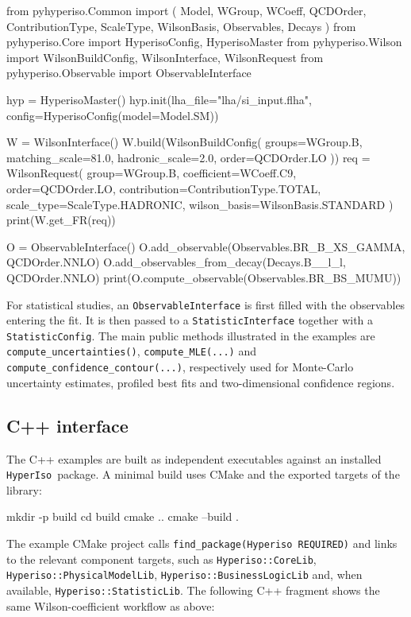 \documentclass[preprint,11pt]{elsarticle}
\newcommand{\hi}{\texttt{HyperIso}}
\begin{document}
\begin{pycode}
from pyhyperiso.Common import (
    Model, WGroup, WCoeff, QCDOrder,
    ContributionType, ScaleType, WilsonBasis,
    Observables, Decays
)
from pyhyperiso.Core import HyperisoConfig, HyperisoMaster
from pyhyperiso.Wilson import WilsonBuildConfig, WilsonInterface, WilsonRequest
from pyhyperiso.Observable import ObservableInterface

hyp = HyperisoMaster()
hyp.init(lha_file="lha/si_input.flha", config=HyperisoConfig(model=Model.SM))

W = WilsonInterface()
W.build(WilsonBuildConfig(
    groups={WGroup.B}, matching_scale=81.0,
    hadronic_scale=2.0, order=QCDOrder.LO
))
req = WilsonRequest(
    group=WGroup.B, coefficient=WCoeff.C9, order=QCDOrder.LO,
    contribution=ContributionType.TOTAL, scale_type=ScaleType.HADRONIC,
    wilson_basis=WilsonBasis.STANDARD
)
print(W.get_FR(req))

O = ObservableInterface()
O.add_observable(Observables.BR_B_XS_GAMMA, QCDOrder.NNLO)
O.add_observables_from_decay(Decays.B__l_l, QCDOrder.NNLO)
print(O.compute_observable(Observables.BR_BS_MUMU))
\end{pycode}

For statistical studies, an \texttt{ObservableInterface} is first filled with the observables entering the fit. It is then passed to a \texttt{StatisticInterface} together with a \texttt{StatisticConfig}. The main public methods illustrated in the examples are \texttt{compute\_uncertainties()}, \texttt{compute\_MLE(...)} and \texttt{compute\_confidence\_contour(...)}, respectively used for Monte-Carlo uncertainty estimates, profiled best fits and two-dimensional confidence regions.

\subsection{C++ interface}

The C++ examples are built as independent executables against an installed \hi~package. A minimal build uses CMake and the exported targets of the library:

\begin{terminal}
mkdir -p build
cd build
cmake ..
cmake --build .
\end{terminal}

The example CMake project calls \texttt{find\_package(Hyperiso REQUIRED)} and links to the relevant component targets, such as \texttt{Hyperiso::CoreLib}, \texttt{Hyperiso::PhysicalModelLib}, \texttt{Hyperiso::BusinessLogicLib} and, when available, \texttt{Hyperiso::StatisticLib}. The following C++ fragment shows the same Wilson-coefficient workflow as above:
\end{document}
